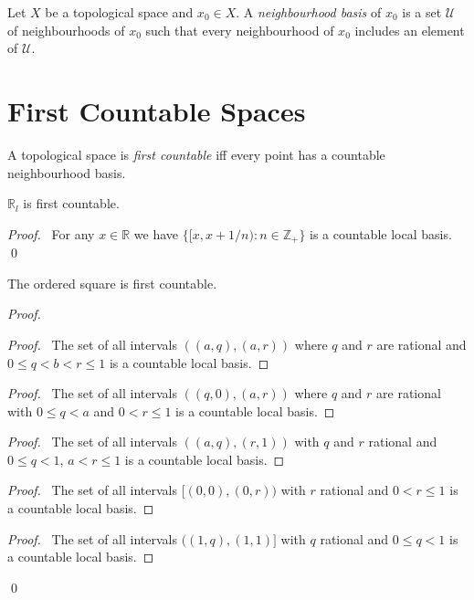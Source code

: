 \begin{df}
Let $X$ be a topological space and $x_0 \in X$. A \emph{neighbourhood basis} of $x_0$ is a set $\mathcal{U}$ of neighbourhoods of $x_0$ such that every neighbourhood of $x_0$ includes an element of $\mathcal{U}$.
\end{df}

\section{First Countable Spaces}

\begin{df}
A topological space is \emph{first countable} iff every point has a countable neighbourhood basis.
\end{df}

\begin{prop}
$\mathbb{R}_l$ is first countable.
\end{prop}

\begin{proof}
\pf\ For any $x \in \mathbb{R}$ we have $\{ [x, x + 1/n) : n \in \mathbb{Z}_+ \}$ is a countable local basis. \qed
\end{proof}

\begin{prop}
The ordered square is first countable.
\end{prop}

\begin{proof}
\pf
{}
\begin{proof}
	\pf\ The set of all intervals $((a,q),(a,r))$ where $q$ and $r$ are rational and $0 \leq q < b < r \leq 1$ is a countable local basis.
\end{proof}
\begin{proof}
	\pf\ The set of all intervals $((q,0),(a,r))$ where $q$ and $r$ are rational with $0 \leq q < a$ and $0 < r \leq 1$ is a countable local basis.
\end{proof}
\begin{proof}
	\pf\ The set of all intervals $((a,q),(r,1))$ with $q$ and $r$ rational and $0 \leq q < 1$, $a < r \leq 1$ is a countable local basis.
\end{proof}
\begin{proof}
	\pf\ The set of all intervals $[(0,0),(0,r))$ with $r$ rational and $0 < r \leq 1$ is a countable local basis.
\end{proof}
\begin{proof}
	\pf\ The set of all intervals $((1,q),(1,1)]$ with $q$ rational and $0 \leq q < 1$ is a countable local basis.
\end{proof}
\qed
\end{proof}
